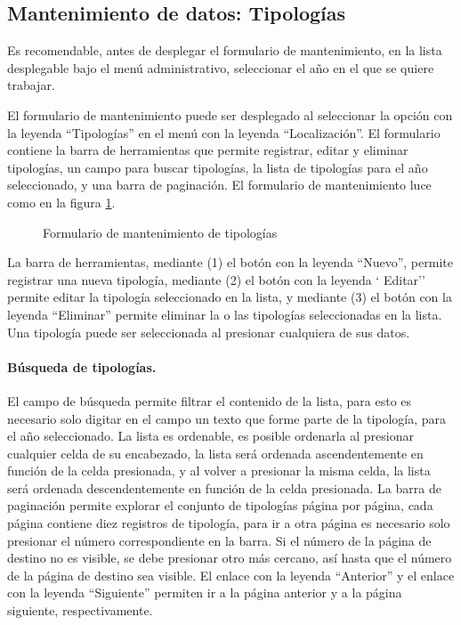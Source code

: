 \documentclass[a4paper, 9pt, conference]{article}              %
\begin{document}
\subsection{Mantenimiento de datos: Tipolog\'ias}
Es recomendable, antes de desplegar el formulario de mantenimiento, en la lista desplegable bajo el men\'u administrativo, seleccionar el a\~no en el que se quiere trabajar.

El formulario de mantenimiento puede ser desplegado al seleccionar la opci\'on con la leyenda ``Tipolog\'ias'' en el men\'u con la leyenda ``Localizaci\'on''. El formulario contiene la barra de herramientas que permite registrar, editar y eliminar tipolog\'ias, un campo para buscar tipolog\'ias, la lista de tipolog\'ias para el a\~no seleccionado, y una barra de paginaci\'on. El formulario de mantenimiento luce como en la figura \ref{fig:geotypologies}.

\begin{figure}
	\centering
		\caption{Formulario de mantenimiento de tipolog\'ias}
	\label{fig:geotypologies}
\end{figure}

La barra de herramientas, mediante (1) el bot\'on con la leyenda ``Nuevo'', permite registrar una nueva tipolog\'ia, mediante (2) el bot\'on con la leyenda ` Editar'' permite editar la tipolog\'ia seleccionado en la lista, y mediante (3) el bot\'on con la leyenda ``Eliminar'' permite eliminar la o las tipolog\'ias seleccionadas en la lista. Una tipolog\'ia puede ser seleccionada al presionar cualquiera de sus datos.

\paragraph{B\'usqueda de tipolog\'ias.}

El campo de b\'usqueda permite filtrar el contenido de la lista, para esto es necesario solo digitar en el campo un texto que forme parte de la tipolog\'ia, para el a\~no seleccionado. La lista es ordenable, es posible ordenarla al presionar cualquier celda de su encabezado, la lista ser\'a ordenada ascendentemente en funci\'on de la celda presionada, y al volver a presionar la misma celda, la lista ser\'a ordenada descendentemente en funci\'on de la celda presionada. La barra de paginaci\'on permite explorar el conjunto de tipolog\'ias p\'agina por p\'agina, cada p\'agina contiene diez registros de tipolog\'ia, para ir a otra p\'agina es necesario solo presionar el n\'umero correspondiente en la barra. Si el n\'umero de la p\'agina de destino no es visible, se debe presionar otro m\'as cercano, as\'i hasta que el n\'umero de la p\'agina de destino sea visible. El enlace con la leyenda ``Anterior'' y el enlace con la leyenda ``Siguiente'' permiten ir a la p\'agina anterior y a la p\'agina siguiente, respectivamente.
\end{document}
